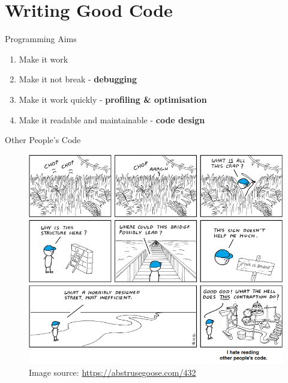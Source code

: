 \part{Writing Good Code}
\frame{\partpage}

\begin{frame}{Programming Aims}
	\begin{enumerate}
		\item\pause Make it work
		\item\pause Make it not break - \textbf{debugging}
		\item\pause Make it work quickly - \textbf{profiling \& optimisation}
		\item\pause Make it readable and maintainable - \textbf{code design}
	\end{enumerate}
\end{frame}

\begin{frame}{Other People's Code}
	\begin{center}
		\begin{figure}[h!]
			\includegraphics[height=0.8\textheight]{opc}
			\caption*{Image source: \url{https://abstrusegoose.com/432}}
		\end{figure}
	\end{center}
\end{frame}